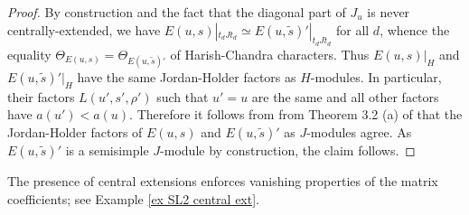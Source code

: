 \documentclass[10pt]{article}
\newcommand{\Bb}{\mathcal{B}}
\newcommand{\C}{\mathbb{C}}
\newcommand{\Sn}{\mathfrak{S}}
\newcommand{\An}{\mathfrak{A}}
\newcommand{\triv}{\mathrm{triv}}
\newcommand{\sgn}{\mathrm{sgn}}
\theoremstyle{definition}
\theoremstyle{remark}
\newtheorem{rem}{Remark}
\newcommand{\Zur}{Z_{G^\vee}(u)^{\mathrm{red}}}
\newcommand{\std}{\mathrm{std}}
\begin{document}
%
\begin{proof}
By construction and the fact that the diagonal part of $J_u$ is never 
centrally-extended, we have
$E(u,s)|_{t_dJt_d}\simeq E(u,\tilde{s})'|_{t_dJt_d}$
for all $d$, whence the equality $\Theta_{E(u,s)}=\Theta_{E(u,\tilde{s})'}$ 
of Harish-Chandra characters.
Thus $E(u,s)|_H$ and $E(u,\tilde{s})'|_H$ have the same Jordan-Holder factors as $H$-modules. 
In particular, their factors $L(u',s',\rho')$ such that $u'=u$ are the same and all other factors have
$a(u')<a(u)$. 
Therefore it follows from from Theorem 3.2 (a) of \cite{XiJAMS} that the Jordan-Holder factors
of $E(u,s)$ and $E(u,\tilde{s})'$ as $J$-modules agree. As 
$E(u,\tilde{s})'$ is a semisimple $J$-module by construction, the claim follows.
\end{proof}
%
The presence of central extensions enforces vanishing properties of the matrix coefficients;
see Example \ref{ex SL2 central ext}.
%
%
%
\end{document}
